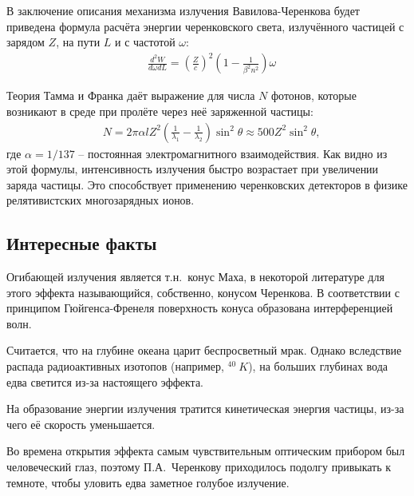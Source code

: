 \begin{main}
	В заключение описания механизма излучения Вавилова-Черенкова будет приведена формула расчёта энергии черенковского света, излучённого частицей с зарядом $ Z $, на пути $ L $ и с частотой $ \omega $:
	\begin{align}
		& \frac{d^2 W}{d \omega dL} = \left(\frac{Z}{c}\right)^2 \left(1 - \frac{1}{\beta^2 n^2}\right) \omega
		\label{intensity}
	\end{align}
	
	Теория Тамма и Франка даёт выражение для числа $N$ фотонов, которые возникают в среде при пролёте через неё заряженной частицы:
	\begin{align}
		& N = 2 \pi \alpha l Z^2 \left(\frac{1}{\lambda_1} - \frac{1}{\lambda_2}\right) \sin^2{\theta}\approx 500 Z^2 \sin^2{\theta},
		\label{restr}
	\end{align}
	где $ \alpha = 1/137$ -- постоянная электромагнитного взаимодействия. 
	Как видно из этой формулы, интенсивность излучения быстро возрастает при увеличении заряда частицы. Это способствует применению черенковских детекторов в физике релятивистских многозарядных ионов. 
	
	\subsection{Интересные факты}
	\label{sec:subsection}
	
	Огибающей излучения является т.н.~конус Маха, в некоторой литературе для этого эффекта называющийся, собственно, конусом Черенкова. В соответствии с принципом Гюйгенса-Френеля поверхность конуса образована интерференцией волн.
	
	Считается, что на глубине океана царит беспросветный мрак. Однако вследствие распада радиоактивных изотопов (например, ${}^{40}~K$), на больших глубинах вода едва светится из-за настоящего эффекта. 
	
	На образование энергии излучения тратится кинетическая энергия частицы, из-за чего её скорость уменьшается. 
	
	Во времена открытия эффекта самым чувствительным оптическим прибором был человеческий глаз, поэтому П.А.~Черенкову приходилось подолгу привыкать к темноте, чтобы уловить едва заметное голубое излучение. 
	

\end{main}
